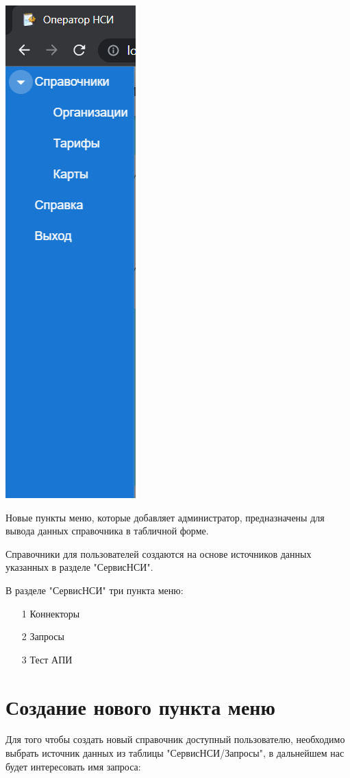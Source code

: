 \documentclass[12pt, a4paper]{article}
\begin{document}
\begin{center}
    \includegraphics  {p3.png}
\end{center}

Новые пункты меню, которые добавляет администратор, предназначены для вывода данных справочника в табличной форме.

Справочники для пользователей создаются на основе источников данных указанных в разделе "СервисНСИ". 

В разделе "СервисНСИ" три пункта меню:
\begin{itemize}
    \item [1] {Коннекторы}
    \item [2] {Запросы}
    \item [3] {Тест АПИ}
\end{itemize}

\section{Создание нового пункта меню}
Для того чтобы создать новый справочник доступный пользователю, необходимо выбрать источник данных из таблицы
"СервисНСИ/Запросы", в дальнейшем нас будет интересовать имя запроса:
\end{document}
